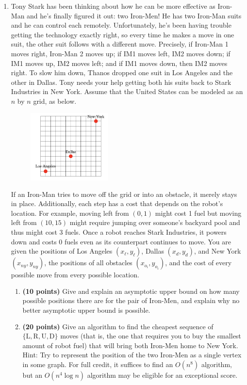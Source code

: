 \documentclass[11pt]{article}
\begin{document}
\begin{enumerate}
\item Tony Stark has been thinking about how he can be more effective as Iron-Man and he's finally figured it out: two Iron-Men! He has two Iron-Man suits and he can control each remotely. Unfortunately, he's been having trouble getting the technology exactly right, so every time he makes a move in one suit, the other suit follows with a different move. Precisely, if Iron-Man 1 moves right, Iron-Man 2 moves up; if IM1 moves left, IM2 moves down; if IM1 moves up, IM2 moves left; and if IM1 moves down, then IM2 moves right. To slow him down, Thanos dropped one suit in Los Angeles and the other in Dallas. Tony needs your help getting both his suits back to Stark Industries in New York.
Assume that the United States can be modeled as an $n$ by $n$ grid, as below.

\begin{figure}[H]
    \centering
    \includegraphics[width=0.4\textwidth]{tonystarkgrid.png}
    \label{fig:grid}
\end{figure}

If an Iron-Man tries to move off the grid or into an obstacle, it merely stays in place. Additionally, each step has a cost that depends on the robot's location. For example, moving left from $(0,1)$ might cost 1 fuel but moving left from $(10,15)$ might require jumping over someone's backyard pool and thus might cost 3 fuels. Once a robot reaches Stark Industries, it powers down and costs 0 fuels even as its counterpart continues to move. You are given the positions of Los Angeles $\left(x_{\ell}, y_{\ell}\right)$, Dallas $\left(x_d, y_d\right)$, and New York $\left(x_{n y}, y_{n y}\right)$, the positions of all obstacles $\left(x_{o_i}, y_{o_i}\right)$, and the cost of every possible move from every possible location.
    
\begin{enumerate}
    \item {\bf (10 points)} Give and explain an asymptotic upper bound on how many possible positions there are for the pair of Iron-Men, and explain why no better asymptotic upper bound is possible.
    \item {\bf (20 points)} Give an algorithm to find the cheapest sequence of $\{\mathrm{L}, \mathrm{R}, \mathrm{U}, \mathrm{D}\}$ moves (that is, the one that requires you to buy the smallest amount of robot fuel) that will bring both Iron-Men home to New York.
Hint: Try to represent the position of the two Iron-Men as a single vertex in some graph. For full credit, it suffices to find an $O\left(n^8\right)$ algorithm, but an $O\left(n^4 \log n\right)$ algorithm may be eligible for an exceptional score.
\end{enumerate}


\end{enumerate}
\end{document}
